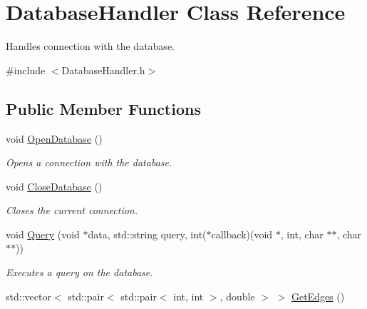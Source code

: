 \hypertarget{classDatabaseHandler}{}\section{Database\+Handler Class Reference}
\label{classDatabaseHandler}


Handles connection with the database.  




{\ttfamily \#include $<$Database\+Handler.\+h$>$}

\subsection*{Public Member Functions}
\begin{DoxyCompactItemize}
\item 
\mbox{\label{classDatabaseHandler_ad8e3c1a3cdb65af2a5963be160f5a33b}} 
void \hyperlink{classDatabaseHandler_ad8e3c1a3cdb65af2a5963be160f5a33b}{Open\+Database} ()
\begin{DoxyCompactList}\small\item\em Opens a connection with the database. \end{DoxyCompactList}\item 
\mbox{\label{classDatabaseHandler_a59d91620a1bd3a42cc6a9b610868aba3}} 
void \hyperlink{classDatabaseHandler_a59d91620a1bd3a42cc6a9b610868aba3}{Close\+Database} ()
\begin{DoxyCompactList}\small\item\em Closes the current connection. \end{DoxyCompactList}\item 
void \hyperlink{classDatabaseHandler_ad6231ac1317c638424c66953bdd26ff0}{Query} (void $\ast$data, std\+::string query, int($\ast$callback)(void $\ast$, int, char $\ast$$\ast$, char $\ast$$\ast$))
\begin{DoxyCompactList}\small\item\em Executes a query on the database. \end{DoxyCompactList}\item 
\mbox{\label{classDatabaseHandler_a5355c23208ba862fabf21338e4c207e5}} 
std\+::vector$<$ std\+::pair$<$ std\+::pair$<$ int, int $>$, double $>$ $>$ \hyperlink{classDatabaseHandler_a5355c23208ba862fabf21338e4c207e5}{Get\+Edges} ()

\end{DoxyCompactItemize}
